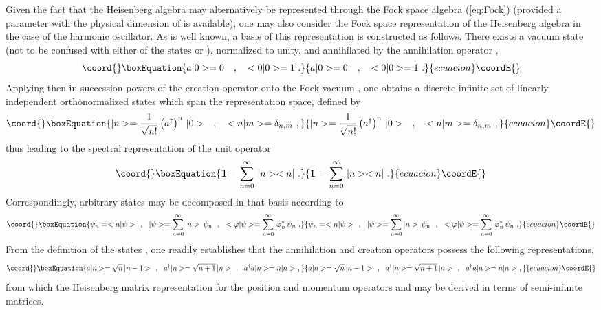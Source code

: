 \documentclass[a4paper,11pt]{article}
\def\one{1\hskip -.37em 1}
\begin{document}
Given the fact that the Heisenberg algebra may alternatively be
represented through the Fock space algebra (\ref{eq:Fock}) (provided
a parameter with the physical dimension of \coordHE{} is available),
one may also consider the Fock space representation of the Heisenberg
algebra in the case of the harmonic oscillator. As is well known, a basis 
of this representation is constructed
as follows. There exists a vacuum state \coordHE{} (not to be confused with
either of the states \coordHE{} or \coordHE{}), normalized to unity, and
annihilated by the annihilation operator \coordHE{},
\begin{equation}\coord{}\boxEquation{
a|0>=0\ \ \ ,\ \ \ <0|0>=1\ .
}{
a|0>=0\ \ \ ,\ \ \ <0|0>=1\ .
}{ecuacion}\coordE{}\end{equation}
Applying then in succession powers of the creation operator \coordHE{}
onto the Fock vacuum \coordHE{},
one obtains a discrete infinite set of linearly independent orthonormalized
states which span the representation space, defined by
\begin{equation}\coord{}\boxEquation{
|n>=\frac{1}{\sqrt{n!}}\left(a^\dagger\right)^n\,|0>\ \ \ ,\ \ \ 
<n|m>=\delta_{n,m}\ ,
}{
|n>=\frac{1}{\sqrt{n!}}\left(a^\dagger\right)^n\,|0>\ \ \ ,\ \ \ 
<n|m>=\delta_{n,m}\ ,
}{ecuacion}\coordE{}\end{equation}
thus leading to the spectral representation of the unit operator
\begin{equation}\coord{}\boxEquation{
\one=\sum_{n=0}^\infty\,|n><n|\ .
}{
\one=\sum_{n=0}^\infty\,|n><n|\ .
}{ecuacion}\coordE{}\end{equation}
Correspondingly, arbitrary states may be decomposed in that basis
according to
\begin{equation}\coord{}\boxEquation{
\psi_n=<n|\psi>\ \ ,\ \ 
|\psi>=\sum_{n=0}^\infty |n>\,\psi_n\ \ ,\ \ 
<\varphi|\psi>=\sum_{n=0}^\infty\,\varphi^*_n\,\psi_n\ .
}{
\psi_n=<n|\psi>\ \ ,\ \ 
|\psi>=\sum_{n=0}^\infty |n>\,\psi_n\ \ ,\ \ 
<\varphi|\psi>=\sum_{n=0}^\infty\,\varphi^*_n\,\psi_n\ .
}{ecuacion}\coordE{}\end{equation}
From the definition of the states \myHighlight{$|n>$}\coordHE{}, one readily establishes that
the annihilation and creation operators possess the following
representations,
\begin{equation}\coord{}\boxEquation{
a|n>=\sqrt{n}\,|n-1>\ \ ,\ \ 
a^\dagger|n>=\sqrt{n+1}\,|n>\ \ ,\ \ 
a^\dagger a|n>=n|n>\ ,
}{
a|n>=\sqrt{n}\,|n-1>\ \ ,\ \ 
a^\dagger|n>=\sqrt{n+1}\,|n>\ \ ,\ \ 
a^\dagger a|n>=n|n>\ ,
}{ecuacion}\coordE{}\end{equation}
from which the Heisenberg matrix representation for the position and
momentum operators \coordHE{} and \coordHE{} may be derived in terms of
semi-infinite matrices.
\end{document}
